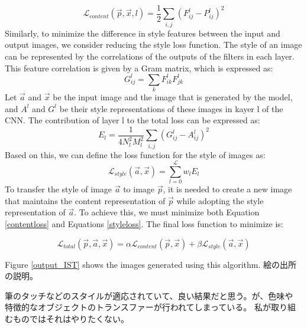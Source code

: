 \begin{equation}
    \label{contentloss}
    \mathcal{ L}_{content}(\vec{p}, \vec{x}, l)=\frac{1}{2} \sum_{i, j}\left(F_{i j}^l-P_{i j}^l\right)^2
\end{equation}
Similarly, to minimize the difference in style features between the input and
output images, we consider reducing the style loss function. The style of an 
image can be represented by the correlations of the outputs of the filters in 
each layer. This feature correlation is given by a Gram matrix, which is 
expressed as:
\begin{equation}
    G_{i j}^l = \sum_k F_{i k}^l F_{j k}^l 
\end{equation}
Let $\vec{a}$ and $\vec{x}$ be the input image and the image that is generated by
the model, and $A^l$ and $G^l$ be their style representations of these images in 
kayer l of the CNN. The contribution of layer l to the total loss can be 
expressed as:
\begin{equation}
    E_l=\frac{1}{4 N_l^2 M_l^2} \sum_{i, j}\left(G_{i j}^l-A_{i j}^l\right)^2
\end{equation}
Based on this, we can define the loss function for the style of images as:
\begin{equation}
    \label{styleloss}
    \mathcal{ L}_{style}(\vec{a}, \vec{x})=\sum_{l=0}^\mathcal{ L}w_{l}E_{l}
\end{equation}
To transfer the style of image $\vec{a}$ to image $\vec{p}$, it is needed to 
create a new image that maintains the content representation of $\vec{p}$ 
while adopting the style representation of $\vec{a}$. To achieve this, we must 
minimize both Equation \ref{contentloss} and Equations \ref{styleloss}.
The final loss function to minimize is:

\begin{equation}
    \mathcal{ L}_{total}(\vec{p}, \vec{a}, \vec{x})=\alpha\mathcal{ L}_{content}(\vec{p}, \vec{x})+\beta\mathcal{ L}_{style}(\vec{a}, \vec{x})
\end{equation}


Figure \ref{output_IST} shows the images generated using this algorithm.
絵の出所の説明。

筆のタッチなどのスタイルが適応されていて、良い結果だと思う。が、色味や
特徴的なオブジェクトのトランスファーが行われてしまっている。
私が取り組むものではそれはやりたくない。

